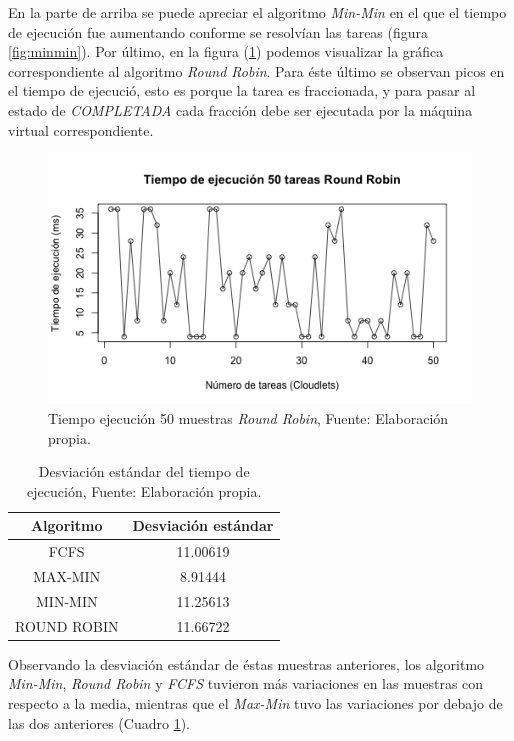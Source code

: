 \documentclass[jou,apacite]{apa6}
\begin{document}
En la parte de arriba se puede apreciar el algoritmo \textit{Min-Min} en el que el tiempo de ejecuci\'on fue aumentando conforme se resolv\'ian las tareas (figura \ref{fig:minmin}). Por último, en la figura (\ref{fig:roundrobin}) podemos visualizar la gráfica correspondiente al algoritmo \textit{Round Robin}. Para éste último se observan picos en el tiempo de ejecució, esto es porque la tarea es fraccionada, y para pasar al estado de \textit{COMPLETADA} cada fracción debe ser ejecutada por la máquina virtual correspondiente.


\renewcommand\thefigure{\arabic{figure}}
\begin{figure}[h!] 
	\centering
	\includegraphics[scale=0.5]{media/roundrobin}
	\caption{Tiempo ejecuci\'on 50 muestras \textit{Round Robin}, Fuente: Elaboraci\'on propia.}
	\label{fig:roundrobin}
\end{figure}


\renewcommand\thetable{\arabic{table}}
\begin{table}[h!]
	\centering
	\begin{tabular}{@{}cc@{}}
		\toprule
		{\bf Algoritmo} & \multicolumn{1}{l}{{\bf Desviaci\'on est\'andar}} \\ \midrule
		FCFS & 11.00619 \\
		MAX-MIN & 8.91444 \\
		MIN-MIN & 11.25613 \\ 
		ROUND ROBIN & 11.66722 \\ \bottomrule
		
	\end{tabular}
	\caption{Desviaci\'on est\'andar del tiempo de ejecuci\'on, Fuente: Elaboraci\'on propia.}
	\label{tiempotabla}
\end{table}

Observando la desviaci\'on est\'andar de \'estas muestras anteriores, los algoritmo \textit{Min-Min}, \textit{Round Robin} y \textit{FCFS} tuvieron m\'as variaciones en las muestras con respecto a la media, mientras que el \textit{Max-Min} tuvo las variaciones por debajo de las dos anteriores (Cuadro \ref{tiempotabla}).
\end{document}
